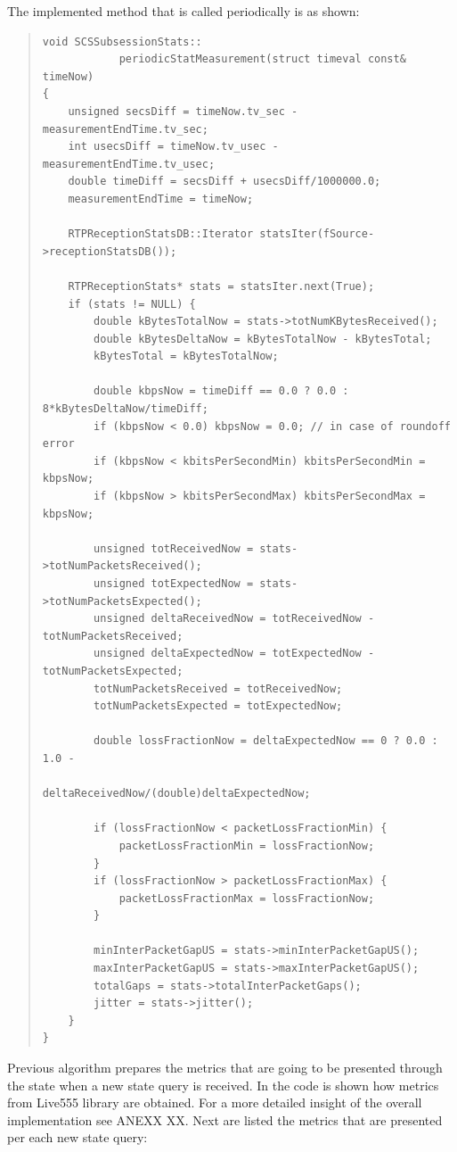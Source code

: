 The implemented method that is called periodically is as shown:

\begin{quote}
\begin{verbatim}
void SCSSubsessionStats::
			periodicStatMeasurement(struct timeval const& timeNow) 
{
    unsigned secsDiff = timeNow.tv_sec - measurementEndTime.tv_sec;
    int usecsDiff = timeNow.tv_usec - measurementEndTime.tv_usec;
    double timeDiff = secsDiff + usecsDiff/1000000.0;
    measurementEndTime = timeNow;

    RTPReceptionStatsDB::Iterator statsIter(fSource->receptionStatsDB());

    RTPReceptionStats* stats = statsIter.next(True);
    if (stats != NULL) {
        double kBytesTotalNow = stats->totNumKBytesReceived();
        double kBytesDeltaNow = kBytesTotalNow - kBytesTotal;
        kBytesTotal = kBytesTotalNow;

        double kbpsNow = timeDiff == 0.0 ? 0.0 : 8*kBytesDeltaNow/timeDiff;
        if (kbpsNow < 0.0) kbpsNow = 0.0; // in case of roundoff error
        if (kbpsNow < kbitsPerSecondMin) kbitsPerSecondMin = kbpsNow;
        if (kbpsNow > kbitsPerSecondMax) kbitsPerSecondMax = kbpsNow;

        unsigned totReceivedNow = stats->totNumPacketsReceived();
        unsigned totExpectedNow = stats->totNumPacketsExpected();
        unsigned deltaReceivedNow = totReceivedNow - totNumPacketsReceived;
        unsigned deltaExpectedNow = totExpectedNow - totNumPacketsExpected;
        totNumPacketsReceived = totReceivedNow;
        totNumPacketsExpected = totExpectedNow;

        double lossFractionNow = deltaExpectedNow == 0 ? 0.0 : 1.0 -
        							 deltaReceivedNow/(double)deltaExpectedNow;

        if (lossFractionNow < packetLossFractionMin) {
            packetLossFractionMin = lossFractionNow;
        }
        if (lossFractionNow > packetLossFractionMax) {
            packetLossFractionMax = lossFractionNow;
        }

        minInterPacketGapUS = stats->minInterPacketGapUS();
        maxInterPacketGapUS = stats->maxInterPacketGapUS();
        totalGaps = stats->totalInterPacketGaps();
        jitter = stats->jitter();
    }
}
\end{verbatim}
\end{quote} 

Previous algorithm prepares the metrics that are going to be presented through the state when a new state query is received. In the code is shown how metrics from Live555 library are obtained. For a more detailed insight of the overall implementation see ANEXX XX. Next are listed the metrics that are presented per each new state query:

